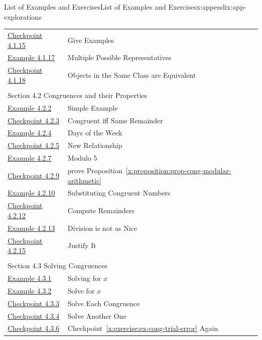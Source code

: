 \documentclass[oneside,10pt,]{book}
\newcommand{\xreffont}{\relax}
\numberwithin{equation}{section}
\begin{document}
\begin{appendixptx}{List of Examples and Exercises}{}{List of Examples and Exercises}{}{}{x:appendix:app-explorations}
\begin{longtable}[l]{ll}
\hyperref[x:exercise:ex-cong-euivalence-example]{Checkpoint 4.1.15}& Give Examples\\
\hyperref[x:example:eg-cong-equivalence-even]{Example 4.1.17}& Multiple Possible Representatives\\
\hyperref[x:exercise:ex-cong-euivalence-prove-property]{Checkpoint 4.1.18}& Objects in the Same Class are Equivalent\\
\multicolumn{2}{l}{\null}\\[1.5ex] \multicolumn{2}{l}{\large Section 4.2 Congruences and their Properties}\\[0.5ex]
\hyperref[x:example:eg-cong-example]{Example 4.2.2}& Simple Example\\
\hyperref[x:exercise:ex-cong-remainder]{Checkpoint 4.2.3}& Congruent iff Same Remainder\\
\hyperref[x:example:eg-cong-week]{Example 4.2.4}& Days of the Week\\
\hyperref[x:exercise:eg-cong-week-2]{Checkpoint 4.2.5}& New Relationship\\
\hyperref[x:example:eg-cong-mod5]{Example 4.2.7}& Modulo 5\\
\hyperref[x:exercise:ex-cong-prove-modular-arithmetic]{Checkpoint 4.2.9}& prove Proposition~{\xreffont\ref*{x:proposition:prop-cong-modular-arithmetic}}\\
\hyperref[x:example:eg-cong-modular-arithmetic]{Example 4.2.10}& Substituting Congruent Numbers\\
\hyperref[x:exercise:ex-cong-compute-remainder]{Checkpoint 4.2.12}& Compute Remainders\\
\hyperref[x:example:eg-cong-dividing-doesnt-work]{Example 4.2.13}& Division is not as Nice\\
\hyperref[x:exercise:ex-cong-division-explain]{Checkpoint 4.2.15}& Justify It\\
\multicolumn{2}{l}{\null}\\[1.5ex] \multicolumn{2}{l}{\large Section 4.3 Solving Congruences}\\[0.5ex]
\hyperref[x:example:eg-cong-solve-congruence]{Example 4.3.1}& Solving for \(x\)\\
\hyperref[x:example:eg-cong-solve-congruence-express]{Example 4.3.2}& Solve for \(x\)\\
\hyperref[x:exercise:ex-cong-solve-for-x]{Checkpoint 4.3.3}& Solve Each Congruence\\
\hyperref[x:exercise:ex-cong-trial-error]{Checkpoint 4.3.4}& Solve Another One\\
\hyperref[x:exercise:ex-cong-multiplicative-inverse]{Checkpoint 4.3.6}& Checkpoint~{\xreffont\ref*{x:exercise:ex-cong-trial-error}} Again\\

\end{longtable}
\end{appendixptx}
\end{document}
